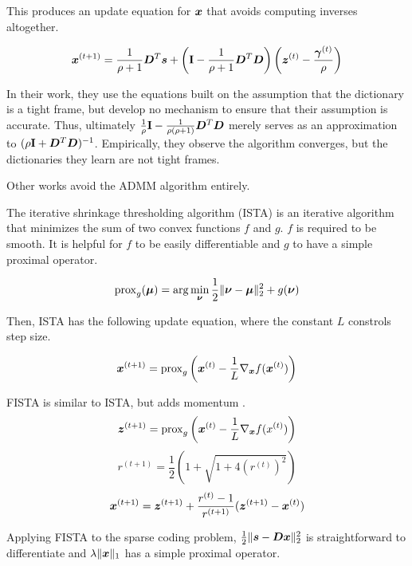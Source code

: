 This produces an update equation for $\bm{x}$ that avoids computing inverses altogether.

\begin{equation}
\bm{x}^{(t + 1)} = \frac{1}{\rho + 1}\bm{D}^T\bm{s} + \left({\bf I} - \frac{1}{\rho + 1}\bm{D}^T\bm{D}\right)\left(\bm{z}^{(t)} - \frac{\bm{\gamma}^{(t)}}{\rho}\right)
\end{equation}

In their work, they use the equations built on the assumption that the dictionary is a tight frame, but develop no mechanism to ensure that their assumption is accurate. Thus, ultimately $\frac{1}{\rho}{\bf I} - \frac{1}{\rho(\rho + 1)}\bm{D}^T\bm{D}$ merely serves as an approximation to $(\rho{\bf I} + \bm{D}^T\bm{D})^{-1}$. Empirically, they observe the algorithm converges, but the dictionaries they learn are not tight frames.

Other works avoid the ADMM algorithm entirely.

The iterative shrinkage thresholding algorithm (ISTA) is an iterative algorithm that minimizes the sum of two convex functions $f$ and $g$. $f$ is required to be smooth. It is helpful for $f$ to be easily differentiable and $g$ to have a simple proximal operator.

\begin{equation}
\operatorname{prox}_g(\bm{\mu}) = \arg \min_{\bm{\nu}} \frac{1}{2}\|\bm{\nu} - \bm{\mu}\|_2^2 + g(\bm{\nu})
\end{equation}

Then, ISTA has the following update equation, where the constant $L$ constrols step size.

\begin{equation}
\bm{x}^{(t + 1)} = \operatorname{prox}_g\left(\bm{x}^{(t)} - \frac{1}{L}\nabla_{\bm{x}} f(\bm{x}^{(t)})\right)
\end{equation}

FISTA is similar to ISTA, but adds momentum \cite{beck2009fast}.
\begin{equation}
\bm{z}^{(t + 1)} = \operatorname{prox}_g\left(\bm{x}^{(t)} - \frac{1}{L}\nabla_{\bm{x}}f(x^{(t)})\right)
\end{equation}
\begin{equation}
r^{(t + 1)} = \frac{1}{2}\left(1 + \sqrt{1 + 4(r^{(t)})^2}\right)
\end{equation}
\begin{equation}
\bm{x}^{(t + 1)} = \bm{z}^{(t + 1)} + \frac{r^{(t)} - 1}{r^{(t + 1)}}(\bm{z}^{(t + 1)} - \bm{x}^{(t)})
\end{equation}

Applying FISTA to the sparse coding problem, $\frac{1}{2}\|\bm{s} - \bm{D}\bm{x}\|_2^2$ is straightforward to differentiate and $\lambda\|\bm{x}\|_1$ has a simple proximal operator.

